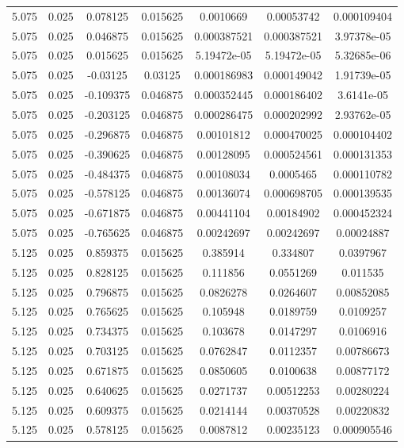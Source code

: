 \begin{flushleft}
\begin{longtable}{ccccccc}
5.075 & 0.025 & 0.078125 & 0.015625 & 0.0010669 & 0.00053742 & 0.000109404  \\ 
5.075 & 0.025 & 0.046875 & 0.015625 & 0.000387521 & 0.000387521 & 3.97378e-05  \\ 
5.075 & 0.025 & 0.015625 & 0.015625 & 5.19472e-05 & 5.19472e-05 & 5.32685e-06  \\ 
5.075 & 0.025 & -0.03125 & 0.03125 & 0.000186983 & 0.000149042 & 1.91739e-05  \\ 
5.075 & 0.025 & -0.109375 & 0.046875 & 0.000352445 & 0.000186402 & 3.6141e-05  \\ 
5.075 & 0.025 & -0.203125 & 0.046875 & 0.000286475 & 0.000202992 & 2.93762e-05  \\ 
5.075 & 0.025 & -0.296875 & 0.046875 & 0.00101812 & 0.000470025 & 0.000104402  \\ 
5.075 & 0.025 & -0.390625 & 0.046875 & 0.00128095 & 0.000524561 & 0.000131353  \\ 
5.075 & 0.025 & -0.484375 & 0.046875 & 0.00108034 & 0.0005465 & 0.000110782  \\ 
5.075 & 0.025 & -0.578125 & 0.046875 & 0.00136074 & 0.000698705 & 0.000139535  \\ 
5.075 & 0.025 & -0.671875 & 0.046875 & 0.00441104 & 0.00184902 & 0.000452324  \\ 
5.075 & 0.025 & -0.765625 & 0.046875 & 0.00242697 & 0.00242697 & 0.00024887  \\ 
5.125 & 0.025 & 0.859375 & 0.015625 & 0.385914 & 0.334807 & 0.0397967  \\ 
5.125 & 0.025 & 0.828125 & 0.015625 & 0.111856 & 0.0551269 & 0.011535  \\ 
5.125 & 0.025 & 0.796875 & 0.015625 & 0.0826278 & 0.0264607 & 0.00852085  \\ 
5.125 & 0.025 & 0.765625 & 0.015625 & 0.105948 & 0.0189759 & 0.0109257  \\ 
5.125 & 0.025 & 0.734375 & 0.015625 & 0.103678 & 0.0147297 & 0.0106916  \\ 
5.125 & 0.025 & 0.703125 & 0.015625 & 0.0762847 & 0.0112357 & 0.00786673  \\ 
5.125 & 0.025 & 0.671875 & 0.015625 & 0.0850605 & 0.0100638 & 0.00877172  \\ 
5.125 & 0.025 & 0.640625 & 0.015625 & 0.0271737 & 0.00512253 & 0.00280224  \\ 
5.125 & 0.025 & 0.609375 & 0.015625 & 0.0214144 & 0.00370528 & 0.00220832  \\ 
5.125 & 0.025 & 0.578125 & 0.015625 & 0.0087812 & 0.00235123 & 0.000905546  \\ 

\end{longtable}
\end{flushleft}
